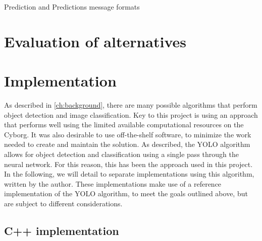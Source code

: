 \documentclass[\rootfolder/main.tex]{subfiles}
\begin{document}
\begin{listing}
    \inputminted{python}{\rootfolder/Chapters/Chapter5/Listings/Prediction.msg}
    \inputminted{python}{\rootfolder/Chapters/Chapter5/Listings/Predictions.msg}
    \caption{Prediction and Predictions message formats\label{lst:prediction-msg}}
\end{listing}


\section{Evaluation of alternatives}



\section{Implementation}

As described in \cref{ch:background}, there are many possible algorithms that perform object detection and image classification.
Key to this project is using an approach that performs well using the limited available computational resources on the Cyborg.
It was also desirable to use off-the-shelf software, to minimize the work needed to create and maintain the solution.
As described, the YOLO algorithm allows for object detection and classification using a single pass through the neural network.
For this reason, this has been the approach used in this project.
In the following, we will detail to separate implementations using this algorithm, written by the author.
These implementations make use of a reference implementation of the YOLO algorithm, to meet the goals outlined above, but are subject to different considerations.


\subsection{C++ implementation}
\end{document}
